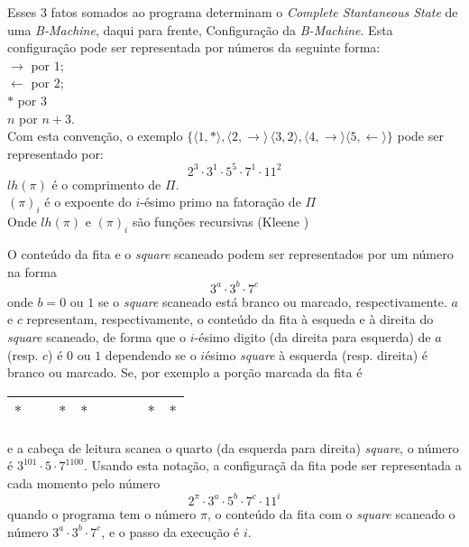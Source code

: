 \documentclass[10pt,letterpaper]{article}
\begin{document}
Esses 3 fatos somados ao programa determinam o \textit{Complete Stantaneous State} de uma \textit{B-Machine}, daqui para frente, Configura\c{c}\~{a}o da \textit{B-Machine}.
Esta configura\c{c}\~{a}o pode ser representada por n\'umeros da seguinte forma:\\
$\rightarrow$ por $1$;\\
$\leftarrow$ por $2$;\\
$*$ por $3$\\
$n$ por $n + 3$.\\

Com esta conven\c{c}\~{a}o, o exemplo $\{\langle 1,* \rangle, \langle 2,\rightarrow \rangle\, \langle 3,2 \rangle, \langle 4,\rightarrow \rangle \langle 5,\leftarrow \rangle\}$ pode ser representado por:
$$
2^3 \cdot 3^1 \cdot 5^5 \cdot 7^1 \cdot 11^2
$$
$lh(\pi)$ \'e o comprimento de $\Pi$.\\
$(\pi)_i$ \'e o expoente do $i$-\'esimo primo na fatora\c{c}\~{a}o de $\Pi$\\
Onde $lh(\pi)$ e $(\pi)_i$ s\~{a}o fun\c{c}\~{o}es recursivas (Kleene \cite{Kleene})

O conte\'udo da fita e o \textit{square} scaneado podem ser representados por um n\'umero na forma $$3^a \cdot 3^b \cdot 7^c$$ onde $b = 0$ ou $1$ se o \textit{square} scaneado est\'a branco ou marcado, respectivamente.
$a$ e $c$ representam, respectivamente, o conte\'udo da fita \`a esqueda e \`a direita do \textit{square} scaneado, de forma que o $i$-\'esimo digito (da direita para esquerda) de $a$ (resp. $c$) \'e $0$ ou $1$ dependendo se o $i$\'esimo \textit{square} \`a esquerda (resp. direita) \'e branco ou marcado. Se, por exemplo a por\c{c}\~{a}o marcada da fita \'e

\begin{center}
\begin{tabular}{|c|c|c|c|c|c|c|c|}
\hline
$*$ & \ & $*$ & $*$ & \ & \ & $*$ & $*$\\
\hline
\end{tabular}
\end{center}

e a cabe\c{c}a de leitura scanea o quarto (da esquerda para direita) \textit{square}, o n\'umero \'e $ 3^{101} \cdot 5 \cdot 7^{1100} $. Usando esta nota\c{c}\~{a}o, a configura\c{c}\~{a} da fita pode ser representada a cada momento pelo n\'umero $$ 2^{\pi} \cdot 3^{a} \cdot 5^{b} \cdot 7^{c} \cdot 11^i $$ quando o programa tem o n\'umero $\pi$, o conte\'udo da fita com o \textit{square} scaneado o n\'umero $3^a \cdot 3^b \cdot 7^c$, e o passo da execu\c{c}\~{a}o \'e $i$.
\end{document}
